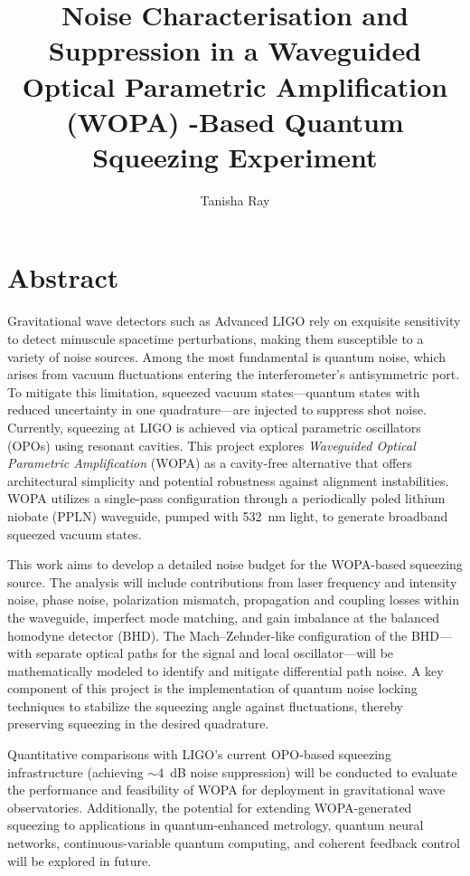 \documentclass[colorlinks=true,pdfstartview=FitV,linkcolor=blue,
citecolor=red,urlcolor=magenta]{ligodoc}
\title{\large{ Noise Characterisation and Suppression in a Waveguided Optical Parametric Amplification (WOPA) -Based Quantum Squeezing Experiment}}
\author{Tanisha Ray}
\begin{document}
\tableofcontents

\newpage
\section{Abstract}


Gravitational wave detectors such as Advanced LIGO rely on exquisite sensitivity to detect minuscule spacetime perturbations, making them susceptible to a variety of noise sources. Among the most fundamental is quantum noise, which arises from vacuum fluctuations entering the interferometer’s antisymmetric port. To mitigate this limitation, squeezed vacuum states—quantum states with reduced uncertainty in one quadrature—are injected to suppress shot noise. Currently, squeezing at LIGO is achieved via optical parametric oscillators (OPOs) using resonant cavities. This project explores \textit{Waveguided Optical Parametric Amplification} (WOPA) as a cavity-free alternative that offers architectural simplicity and potential robustness against alignment instabilities. WOPA utilizes a single-pass configuration through a periodically poled lithium niobate (PPLN) waveguide, pumped with \SI{532}{\nano\meter} light, to generate broadband squeezed vacuum states.

This work aims to develop a detailed noise budget for the WOPA-based squeezing source. The analysis will include contributions from laser frequency and intensity noise, phase noise, polarization mismatch, propagation and coupling losses within the waveguide, imperfect mode matching, and gain imbalance at the balanced homodyne detector (BHD). The Mach–Zehnder-like configuration of the BHD—with separate optical paths for the signal and local oscillator—will be mathematically modeled to identify and mitigate differential path noise. A key component of this project is the implementation of quantum noise locking techniques to stabilize the squeezing angle against fluctuations, thereby preserving squeezing in the desired quadrature.

Quantitative comparisons with LIGO’s current OPO-based squeezing infrastructure (achieving $\sim$4~dB noise suppression) will be conducted to evaluate the performance and feasibility of WOPA for deployment in gravitational wave observatories. Additionally, the potential for extending WOPA-generated squeezing to applications in quantum-enhanced metrology, quantum neural networks, continuous-variable quantum computing, and coherent feedback control will be explored in future.
\end{document}
